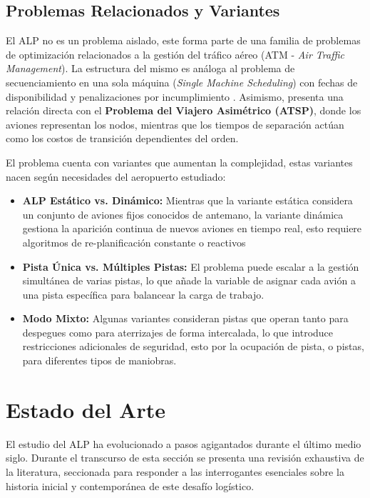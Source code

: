 \documentclass[letter, 10pt]{article}
\begin{document}
\subsection{Problemas Relacionados y Variantes}
El ALP no es un problema aislado, este forma parte de una familia de problemas de optimizaci\'on relacionados a la gesti\'on del tr\'afico a\'ereo (ATM - \textit{Air Traffic Management}). La estructura del mismo es an\'aloga al problema de secuenciamiento en una sola m\'aquina (\textit{Single Machine Scheduling}) con fechas de disponibilidad y penalizaciones por incumplimiento\cite{beasley2000}
. Asimismo, presenta una relaci\'on directa con el \textbf{Problema del Viajero Asim\'etrico (ATSP)}, donde los aviones representan los nodos, mientras que los tiempos de separaci\'on act\'uan como los costos de transici\'on dependientes del orden. \cite{prakash2018}


El problema cuenta con variantes que aumentan la complejidad, estas variantes nacen seg\'un necesidades del aeropuerto estudiado:
\begin{itemize}
    \item \textbf{ALP Est\'atico vs. Din\'amico:} Mientras que la variante est\'atica considera un conjunto de aviones fijos conocidos de antemano\cite{beasley2000}, la variante din\'amica gestiona la aparici\'on continua de nuevos aviones en tiempo real, esto requiere algoritmos de re-planificaci\'on constante o reactivos \cite{ikli2021}
    \item \textbf{Pista \'Unica vs. M\'ultiples Pistas:} El problema puede escalar a la gesti\'on simult\'anea de varias pistas, lo que a\~nade la variable de asignar cada avi\'on a una pista espec\'ifica para balancear la carga de trabajo\cite{beasley2000}.
    \item \textbf{Modo Mixto:} Algunas variantes consideran pistas que operan tanto para despegues como para aterrizajes de forma intercalada, lo que introduce restricciones adicionales de seguridad, esto por la ocupaci\'on de pista, o pistas, para diferentes tipos de maniobras\cite{bennell2011}.
\end{itemize}



\section{Estado del Arte}
El estudio del ALP ha evolucionado a pasos agigantados durante el \'ultimo medio siglo. Durante el transcurso de esta secci\'on se presenta una revisi\'on exhaustiva de la literatura, seccionada para responder a las interrogantes esenciales sobre la historia inicial y contempor\'anea de este desaf\'io log\'istico.
\end{document}
